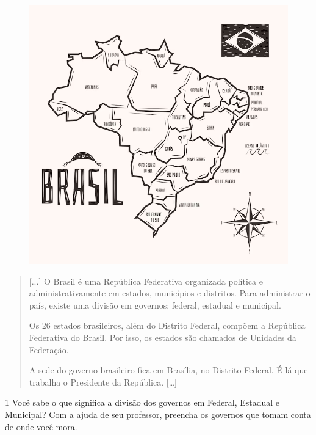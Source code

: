 \begin{figure}[htpb!]
\includegraphics[width=1.2\textwidth]{./imgs/img46.png}
\caption{}
\end{figure}

\pagebreak

\begin{quote}
{[}...{]} O Brasil é uma República Federativa organizada política e
administrativamente em estados, municípios e distritos. Para administrar
o país, existe uma divisão em governos: federal, estadual e municipal.

Os 26 estados brasileiros, além do Distrito Federal, compõem a República
Federativa do Brasil. Por isso, os estados são chamados de Unidades da
Federação.

A sede do governo brasileiro fica em Brasília, no Distrito Federal. É lá
que trabalha o Presidente da República. {[}\ldots{}{]}

\end{quote}

\num{1} Você sabe o que significa a divisão dos governos em Federal, Estadual e
Municipal? Com a ajuda de seu professor, preencha os governos que tomam
conta de onde você mora.

